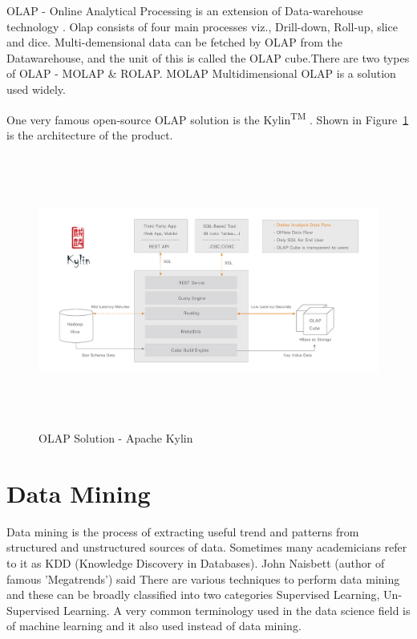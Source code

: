 OLAP - Online Analytical Processing is an extension of Data-warehouse technology . Olap consists of four main processes viz., Drill-down, Roll-up, slice and dice. Multi-demensional data can be fetched by OLAP from the Datawarehouse, and the unit of this is called the OLAP cube.There are two types of OLAP - MOLAP \& ROLAP. MOLAP Multidimensional OLAP is a solution used widely. 

One very famous open-source  OLAP solution is the Kylin\textsuperscript{TM} . Shown in Figure~\ref{fig:Kyline} is the architecture of the product.


\begin{figure}[h]
	\includegraphics[width=\columnwidth,height=9cm]{figures/kylin_diagram.png}
	\centering
	\caption{OLAP Solution - Apache Kylin}
	\label{fig:Kyline}
\end{figure}


\section{Data Mining}
\label{data-mining}
Data mining is the process of extracting useful trend and patterns from structured and unstructured sources of data. Sometimes many academicians refer to it as KDD (Knowledge Discovery in Databases). John Naisbett (author of famous 'Megatrends') said 
There are various techniques to perform data mining and these can be broadly classified into two categories Supervised Learning, Un-Supervised Learning.	
A very common terminology used in the data science field is of machine learning and it also used instead of data mining. 

